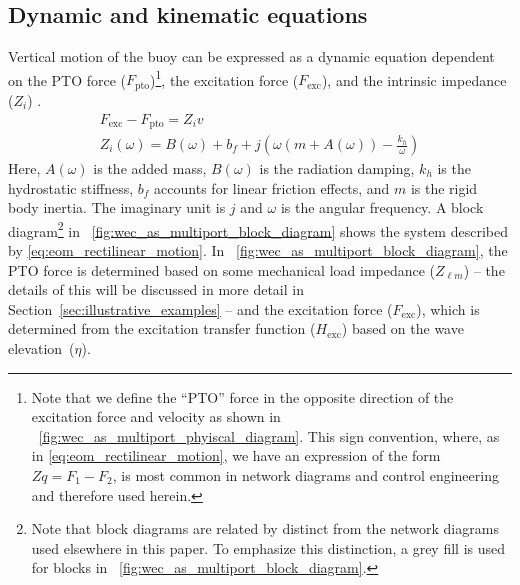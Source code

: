 \documentclass[lettersize,journal]{IEEEtran}
\begin{document}
\subsection{Dynamic and kinematic equations}\label{sec:dynamic_and_kinematic_equations}
Vertical motion of the buoy can be expressed as a dynamic equation dependent on the PTO force ($F_{\textrm{pto}}$)\footnote{Note that we define the ``PTO'' force in the opposite direction of the excitation force and velocity as shown in \figurename~\ref{fig:wec_as_multiport_phyiscal_diagram}. This sign convention, where, as in \eqref{eq:eom_rectilinear_motion}, we have an expression of the form $Z q = F_1 - F_2$, is most common in network diagrams and control engineering and therefore used herein.}, the excitation force ($F_{\textrm{exc}}$), and the intrinsic impedance ($Z_i$) \cite{Falnes:2002aa}.
%
\begin{subequations}
\begin{gather}
        F_{\textrm{exc}} - F_{\textrm{pto}} = Z_i v \label{eq:eom_rectilinear_motion} \\
        Z_i(\omega) = B(\omega) + b_f + j \left( \omega \left( m + A(\omega) \right) - \frac{k_{h}}{\omega}\right)
\end{gather}
\end{subequations}
%
\noindent{}Here, $A(\omega)$ is the added mass, $B(\omega)$ is the radiation damping, $k_h$ is the hydrostatic stiffness, $b_f$ accounts for linear friction effects, and $m$ is the rigid body inertia.
The imaginary unit is $j$ and $\omega$ is the angular frequency.
A block diagram\footnote{\label{fn:block_diagrams}Note that block diagrams are related by distinct from the network diagrams used elsewhere in this paper. To emphasize this distinction, a grey fill is used for blocks in \figurename~\ref{fig:wec_as_multiport_block_diagram}.} in \figurename~\ref{fig:wec_as_multiport_block_diagram} shows the system described by \eqref{eq:eom_rectilinear_motion}.
In \figurename~\ref{fig:wec_as_multiport_block_diagram}, the PTO force is determined based on some mechanical load impedance ($Z_{\ell m}$) -- the details of this will be discussed in more detail in Section~\ref{sec:illustrative_examples} -- and the excitation force ($F_{\textrm{exc}}$), which is determined from the excitation transfer function ($H_{\textrm{exc}}$) based on the wave elevation~($\eta$).
\end{document}
